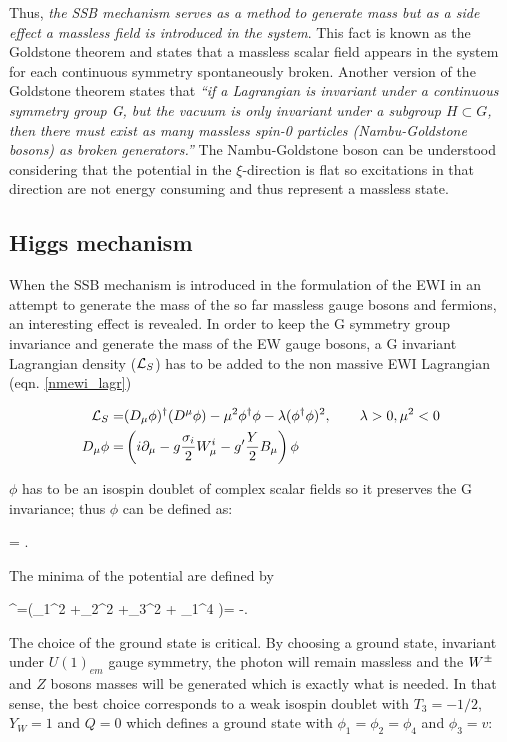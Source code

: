 \noindent Thus, \textit {the SSB mechanism serves as a method to generate mass but as a side effect a massless field is introduced in the system}. This fact is known as the Goldstone theorem and states that a massless scalar field appears in the system for each continuous symmetry spontaneously broken. Another version of the Goldstone theorem states that \textit{``if a Lagrangian is invariant under a continuous symmetry group G, but the vacuum is only invariant under a subgroup $H\subset G$, then there must exist as many massless spin-0 particles (Nambu-Goldstone bosons) as broken generators.''}\cite{pich} The Nambu-Goldstone boson can be understood considering that the potential in the $\xi$-direction is flat so excitations in that direction are not energy consuming and thus represent a massless state.                   

\subsection{Higgs mechanism}

\noindent When the SSB mechanism is introduced in the formulation of the EWI in an attempt to generate the mass of the so far massless gauge bosons and fermions, an interesting effect is revealed. In order to keep the G symmetry group invariance and generate the mass of the EW gauge bosons, a G invariant Lagrangian density ($\mathcal{L}_S$) has to be added to the non massive EWI Lagrangian (eqn. \ref{nmewi_lagr})

\begin{align}
\mathcal{L}_S    = &(D_\mu\phi)^\dagger(D^\mu\phi) - \mu^2\phi^\dagger\phi - \lambda(\phi^\dagger\phi)^2 , \qquad \lambda>0, \mu^2<0 \label{ls}\\
D_\mu\phi = &\left(i\partial_\mu - g\frac{\sigma_i}{2}W^i_\mu -
g'\frac{Y}{2}B_\mu\right)\phi
\end{align}

\noindent $\phi$ has to be an isospin doublet of complex scalar fields so it preserves the G invariance; thus $\phi$ can be defined as:

\beqn
\phi =  \equiv {}.
\eeqn

\noindent The minima of the potential are defined by

\beqn
\phi^\dagger\phi=(\phi_1^2 +\phi_2^2 +\phi_3^2 + \phi_1^4 )= -.
\eeqn

\noindent The choice of the ground state is critical. By choosing a ground state, invariant under $U(1)_{em}$ gauge symmetry, the photon will remain massless and the $W^\pm$ and $Z$ bosons masses will be generated which is exactly what is needed. In that sense, the best choice corresponds to a weak isospin doublet with $T_3=-1/2$, $Y_W=1$ and $Q=0$ which defines a ground state with $\phi_1=\phi_2=\phi_4$ and $\phi_3=v$:

